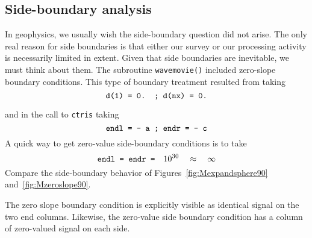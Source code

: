 \subsection{Side-boundary analysis}  
\par
In geophysics, we usually wish the side-boundary question did not arise.
The only real reason for side boundaries is that
either our survey or our processing activity is necessarily limited in extent.
Given that side boundaries are inevitable, we must think about them.
The subroutine {\tt wavemovie()} included zero-slope boundary conditions.
This type of boundary treatment resulted from taking
$$
\hbox{\tt d(1)   =   0.       ;       d(nx)   =   0.}
$$
\par\noindent
and in the call to {\tt ctris} taking
$$
\hbox{\tt endl   =   - a      ;      endr   =   - c}
$$
A quick way to get zero-value side-boundary conditions is to take
$$
\hbox{\tt endl    =    endr    =}\quad    10^{30} \quad  \approx \quad \infty
$$
Compare the side-boundary behavior of
Figures~\ref{fig:Mexpandsphere90} and~\ref{fig:Mzeroslope90}.
\par
The zero slope boundary condition is explicitly visible
as identical signal on the two end columns.
Likewise, the zero-value side boundary condition
has a column of zero-valued signal on each side.


%
%

